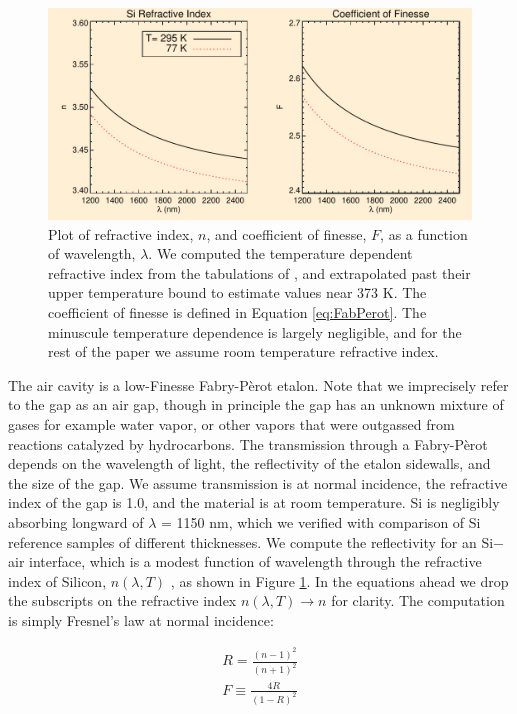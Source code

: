 \documentclass[osajnl,preprint,showpacs,superscriptaddress,12pt]{revtex4-1} %
\begin{document}
\begin{figure}[htbp]
\centerline{\includegraphics[width=0.95\columnwidth]{figs/SiIndexAOmgsFinesseFig.pdf}}
\caption{Plot of refractive index, $n$, and coefficient of finesse, $F$, as a function of wavelength, $\lambda$.\label{figSiIndexFinesse} We computed the temperature dependent refractive index from the tabulations of \cite{2006SPIE.6273E..77F}, and extrapolated past their upper temperature bound to estimate values near 373 K.  The coefficient of finesse is defined in Equation \ref{eq:FabPerot}.  The minuscule temperature dependence is largely negligible, and for the rest of the paper we assume room temperature refractive index.}
\end{figure}

The air cavity is a low-Finesse Fabry-P\`{e}rot etalon\cite{2007fuph.book.....S}.  Note that we imprecisely refer to the gap as an air gap, though in principle the gap has an unknown mixture of gases for example water vapor, or other vapors that were outgassed from reactions catalyzed by hydrocarbons.  The transmission through a Fabry-P\`{e}rot depends on the wavelength of light, the reflectivity of the etalon sidewalls, and the size of the gap.  We assume transmission is at normal incidence, the refractive index of the gap is 1.0, and the material is at room temperature.  Si is negligibly absorbing longward of $\lambda$ = 1150 nm, which we verified with comparison of Si reference samples of different thicknesses.  We compute the reflectivity for an Si$-$air interface, which is a modest function of wavelength through the refractive index of Silicon, $n(\lambda, T)$ \cite{2006SPIE.6273E..77F}, as shown in Figure \ref{figSiIndexFinesse}.  In the equations ahead we drop the subscripts on the refractive index $n(\lambda, T) \rightarrow n$ for clarity.  The computation is simply Fresnel's law at normal incidence:

\begin{eqnarray}
R = \frac{(n-1)^2}{(n+1)^2} \\
F \equiv \frac{4R}{(1-R)^2}
\end{eqnarray}
\end{document}
